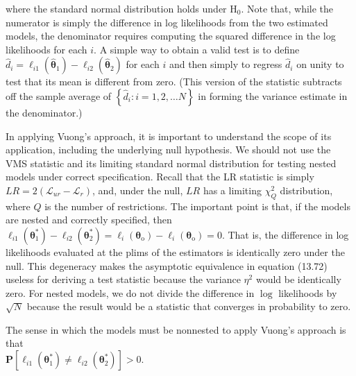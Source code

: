 \documentclass[10pt]{article}
\begin{document}
where the standard normal distribution holds under $\mathrm{H}_{0}$. Note that, while the numerator is simply the difference in log likelihoods from the two estimated models, the denominator requires computing the squared difference in the log likelihoods for each $i$. A simple way to obtain a valid test is to define $\hat{d}_{i}=\ell_{i 1}\left(\hat{\boldsymbol{\theta}}_{1}\right)-\ell_{i 2}\left(\hat{\boldsymbol{\theta}}_{2}\right)$ for each $i$ and then simply to regress $\hat{d}_{i}$ on unity to test that its mean is different from zero. (This version of the statistic subtracts off the sample average of $\left\{\hat{d}_{i}: i=1,2, \ldots N\right\}$ in forming the variance estimate in the denominator.)

In applying Vuong's approach, it is important to understand the scope of its application, including the underlying null hypothesis. We should not use the VMS statistic and its limiting standard normal distribution for testing nested models under correct specification. Recall that the LR statistic is simply $L R=2\left(\mathscr{L}_{u r}-\mathscr{L}_{r}\right)$, and, under the null, $L R$ has a limiting $\chi_{Q}^{2}$ distribution, where $Q$ is the number of restrictions. The important point is that, if the models are nested and correctly specified, then $\ell_{i 1}\left(\boldsymbol{\theta}_{1}^{*}\right)-\ell_{i 2}\left(\boldsymbol{\theta}_{2}^{*}\right)=\ell_{i}\left(\boldsymbol{\theta}_{\mathrm{o}}\right)-\ell_{i}\left(\boldsymbol{\theta}_{\mathrm{o}}\right)=0$. That is, the difference in log likelihoods evaluated at the plims of the estimators is identically zero under the null. This degeneracy makes the asymptotic equivalence in equation (13.72) useless for deriving a test statistic because the variance $\eta^{2}$ would be identically zero. For nested models, we do not divide the difference in $\log$ likelihoods by $\sqrt{N}$ because the result would be a statistic that converges in probability to zero.

The sense in which the models must be nonnested to apply Vuong's approach is that\\
$\mathbf{P}\left[\ell_{i 1}\left(\boldsymbol{\theta}_{1}^{*}\right) \neq \ell_{i 2}\left(\boldsymbol{\theta}_{2}^{*}\right)\right]>0$.
\end{document}
